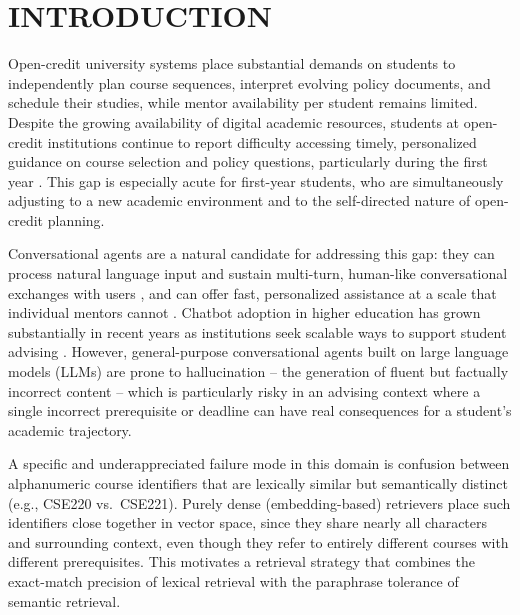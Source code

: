 \documentclass[a4paper,twoside]{article}
\begin{document}
\onecolumn \maketitle \normalsize \setcounter{footnote}{0} \vfill

\section{\uppercase{Introduction}}
\label{sec:introduction}

Open-credit university systems place substantial demands on students to independently plan course sequences, interpret evolving policy documents, and schedule their studies, while mentor availability per student remains limited. Despite the growing availability of digital academic resources, students at open-credit institutions continue to report difficulty accessing timely, personalized guidance on course selection and policy questions, particularly during the first year \citep{nguyen2023lilo}. This gap is especially acute for first-year students, who are simultaneously adjusting to a new academic environment and to the self-directed nature of open-credit planning.

Conversational agents are a natural candidate for addressing this gap: they can process natural language input and sustain multi-turn, human-like conversational exchanges with users \citep{brandtzaeg2017}, and can offer fast, personalized assistance at a scale that individual mentors cannot \citep{shawar2007}. Chatbot adoption in higher education has grown substantially in recent years as institutions seek scalable ways to support student advising \citep{hwang2021}. However, general-purpose conversational agents built on large language models (LLMs) are prone to hallucination -- the generation of fluent but factually incorrect content -- which is particularly risky in an advising context where a single incorrect prerequisite or deadline can have real consequences for a student's academic trajectory.

A specific and underappreciated failure mode in this domain is confusion between alphanumeric course identifiers that are lexically similar but semantically distinct (e.g., CSE220 vs.\ CSE221). Purely dense (embedding-based) retrievers place such identifiers close together in vector space, since they share nearly all characters and surrounding context, even though they refer to entirely different courses with different prerequisites. This motivates a retrieval strategy that combines the exact-match precision of lexical retrieval with the paraphrase tolerance of semantic retrieval.
\end{document}
